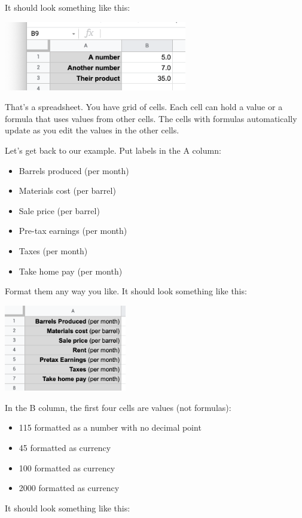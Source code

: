 It should look something like this:

\includegraphics[width=0.6\textwidth]{FirstFormatting.png}

That's a spreadsheet. You have grid of cells. Each cell can hold a
value or a formula that uses values from other cells.  The cells with
formulas automatically update as you edit the values in the other cells.

Let's get back to our example. Put labels in the A column:
\begin{itemize}
\item{Barrels produced (per month)}
\item{Materials cost (per barrel)}
\item{Sale price (per barrel)}
\item{Pre-tax earnings (per month)}
\item{Taxes (per month)}
\item{Take home pay (per month)}
\end{itemize}

Format them any way you like. It should look something like this:

\includegraphics[width=0.4\textwidth]{BarrelLabels.png}

In the B column, the first four cells are values (not formulas):
\begin{itemize}
\item{115 formatted as a number with no decimal point}
\item{45 formatted as currency}
\item{100 formatted as currency}
\item{2000 formatted as currency}
\end{itemize}

It should look something like this:

